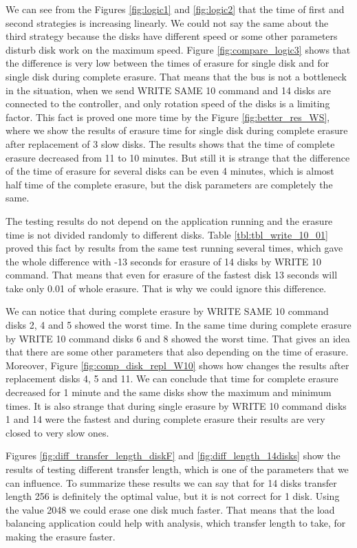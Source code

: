 We can see from the Figures \ref{fig:logic1} and \ref{fig:logic2} that the time of first and second strategies is increasing linearly. We could not say the same about the third strategy because the disks have different speed or some other parameters disturb disk work on the maximum speed. Figure \ref{fig:compare_logic3} shows that the difference is very low between the times of erasure for single disk and for single disk during complete erasure. That means that the bus is not a bottleneck in the situation, when we send WRITE SAME 10 command and 14 disks are connected to the controller, and only rotation speed of the disks is a limiting factor. This fact is proved one more time by the Figure \ref{fig:better_res_WS}, where we show the results of erasure time for single disk during complete erasure after replacement of 3 slow disks. The results shows that the time of complete erasure decreased from 11 to 10 minutes. But still it is strange that the difference of the time of erasure for several disks can be even 4 minutes, which is almost half time of the complete erasure, but the disk parameters are completely the same.

The testing results do not depend on the application running and the erasure time is not divided randomly to different disks. Table \ref{tbl:tbl_write_10_01} proved this fact by results from the same test running several times, which gave the whole difference with -13 seconds for erasure of 14 disks by WRITE 10 command. That means that even for erasure of the fastest disk 13 seconds will take only 0.01 of whole erasure. That is why we could ignore this difference. 

We can notice that during complete erasure by WRITE SAME 10 command disks 2, 4 and 5 showed the worst time. In the same time during complete erasure by WRITE 10 command disks 6 and 8 showed the worst time. That gives an idea that there are some other parameters that also depending on the time of erasure. Moreover, Figure \ref{fig:comp_disk_repl_W10} shows how changes the results after replacement disks 4, 5 and 11. We can conclude that time for complete erasure decreased for 1 minute and the same disks show the maximum and minimum times. It is also strange that during single erasure by WRITE 10 command disks 1 and 14 were the fastest and during complete erasure their results are very closed to very slow ones.

Figures \ref{fig:diff_transfer_length_diskF} and \ref{fig:diff_length_14disks} show the results of testing different transfer length, which is one of the parameters that we can influence. To summarize these results we can say that for 14 disks transfer length 256 is definitely the optimal value, but it is not correct for 1 disk. Using the value 2048 we could erase one disk much faster. That means that the load balancing application could help with analysis, which transfer length to take, for making the erasure faster.
